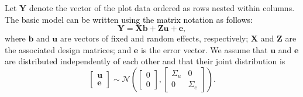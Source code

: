\documentclass[a4paper]{article} 	%
\newcommand{\N}{\mathcal{N}}
\newcommand{\revision}[1]{\textcolor{black}{#1}}
\begin{document}
\revision{Let} $\bm{Y}$ \revision{denote} the vector of the plot data ordered as rows nested within columns. The \revision{basic} model \revision{can be written using the matrix notation as follows:}
\begin{equation}\label{eq:modelmatrix}
	\bm{Y} = \bm{X}\bm{b}+\bm{Z}\bm{u}+\bm{e},
\end{equation}
where $\bm{b}$ and $\bm{u}$ are vectors of fixed and random effects, respectively; $\bm{X}$ and $\bm{Z}$ are the associated design matrices; and $\bm{e}$ is the error vector. We assume that $\bm{u}$ and $\bm{e}$ are \revision{distributed} independent\revision{ly} \revision{of each other} and that their joint distribution is 
\begin{equation}\label{eq:covariance}
	\begin{bmatrix}
		\bm{u} \\ \bm{e}
	\end{bmatrix} \sim \N\left( \begin{bmatrix}
		0\\0 \end{bmatrix}, \begin{bmatrix}
		\Sigma_u & 0 \\ 0 & \Sigma_e
	\end{bmatrix}\right). 
\end{equation}
	

	
\end{document}

